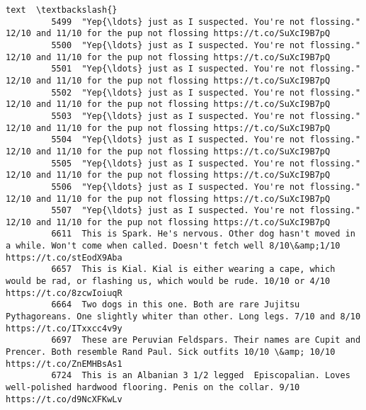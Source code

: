\documentclass[11pt]{article}
\begin{document}
\begin{Verbatim}[commandchars=\\\{\}]
                                                                                                                                                           text  \textbackslash{}
         5499  "Yep{\ldots} just as I suspected. You're not flossing." 12/10 and 11/10 for the pup not flossing https://t.co/SuXcI9B7pQ                                
         5500  "Yep{\ldots} just as I suspected. You're not flossing." 12/10 and 11/10 for the pup not flossing https://t.co/SuXcI9B7pQ                                
         5501  "Yep{\ldots} just as I suspected. You're not flossing." 12/10 and 11/10 for the pup not flossing https://t.co/SuXcI9B7pQ                                
         5502  "Yep{\ldots} just as I suspected. You're not flossing." 12/10 and 11/10 for the pup not flossing https://t.co/SuXcI9B7pQ                                
         5503  "Yep{\ldots} just as I suspected. You're not flossing." 12/10 and 11/10 for the pup not flossing https://t.co/SuXcI9B7pQ                                
         5504  "Yep{\ldots} just as I suspected. You're not flossing." 12/10 and 11/10 for the pup not flossing https://t.co/SuXcI9B7pQ                                
         5505  "Yep{\ldots} just as I suspected. You're not flossing." 12/10 and 11/10 for the pup not flossing https://t.co/SuXcI9B7pQ                                
         5506  "Yep{\ldots} just as I suspected. You're not flossing." 12/10 and 11/10 for the pup not flossing https://t.co/SuXcI9B7pQ                                
         5507  "Yep{\ldots} just as I suspected. You're not flossing." 12/10 and 11/10 for the pup not flossing https://t.co/SuXcI9B7pQ                                
         6611  This is Spark. He's nervous. Other dog hasn't moved in a while. Won't come when called. Doesn't fetch well 8/10\&amp;1/10 https://t.co/stEodX9Aba   
         6657  This is Kial. Kial is either wearing a cape, which would be rad, or flashing us, which would be rude. 10/10 or 4/10 https://t.co/8zcwIoiuqR        
         6664  Two dogs in this one. Both are rare Jujitsu Pythagoreans. One slightly whiter than other. Long legs. 7/10 and 8/10 https://t.co/ITxxcc4v9y         
         6697  These are Peruvian Feldspars. Their names are Cupit and Prencer. Both resemble Rand Paul. Sick outfits 10/10 \&amp; 10/10 https://t.co/ZnEMHBsAs1   
         6724  This is an Albanian 3 1/2 legged  Episcopalian. Loves well-polished hardwood flooring. Penis on the collar. 9/10 https://t.co/d9NcXFKwLv           
         

\end{Verbatim}
\end{document}
